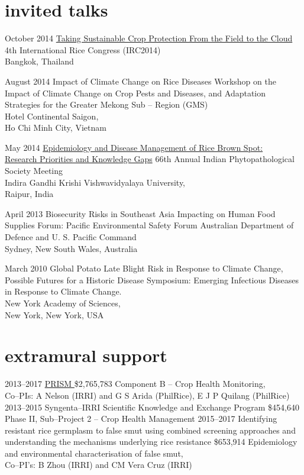 \documentclass[]{friggeri-cv}
\begin{document}
\section*{invited talks}
\begin{entrylist}
 \entry
	{October 2014}
	{\href{http://figshare.com/articles/Taking_Sustainable_Crop_Protection_From_the_Field_to_the_Cloud/1225800}{Taking Sustainable Crop Protection From the Field to the Cloud}}
	{}
	{4th International Rice Congress (IRC2014)\\Bangkok, Thailand}
	{}
	
\entry
 	{August 2014}
	{Impact of Climate Change on Rice Diseases}
	{}
	{Workshop on the Impact of Climate Change on Crop Pests and Diseases, and Adaptation Strategies for the Greater Mekong Sub -- Region (GMS)\\Hotel Continental Saigon,\\Ho Chi Minh City, Vietnam}
	
 \entry
 	{May 2014}
	{\href{http://figshare.com/articles/IPS_2014/1037569}{Epidemiology and Disease Management of Rice Brown Spot:\\Research Priorities and Knowledge Gaps}}
	{}
	{66th Annual Indian Phytopathological Society Meeting\\Indira Gandhi Krishi Vishwavidyalaya University,\\Raipur, India}
	
 \entry
	{April 2013}
	{Biosecurity Risks in Southeast Asia Impacting on Human Food Supplies}
	{}
	{Forum: Pacific Environmental Safety Forum Australian Department of Defence and U. S. Pacific Command\\Sydney, New South Wales, Australia}

 \entry
	 {March 2010} 
	{Global Potato Late Blight Risk in Response to Climate Change, Possible Futures for a Historic Disease}
  	{}
  	{Symposium: Emerging Infectious Diseases in Response to Climate Change.\\New York Academy of Sciences,\\New York, New York, USA}
\end{entrylist}

\section*{extramural support}
  \begin{entrylist}
  \entry
	{2013--2017}
	{\href{http://philippinericeinfo.ph/}{PRISM }}
	{\$2,765,783}
	{Component B -- Crop Health Monitoring,\\Co--PIs: A Nelson (IRRI) and G S Arida (PhilRice), E J P Quilang (PhilRice)}
  \entry
	{2013--2015}
	{Syngenta--IRRI Scientific Knowledge and Exchange Program}
	{\$454,640}
	{Phase II, Sub--Project 2 -- Crop Health Management}
  \entry
    {2015--2017}
    {Identifying resistant rice germplasm to false smut using combined screening approaches and understanding the mechanisms underlying rice resistance}
    {\$653,914}
    {Epidemiology and environmental characterisation of false smut,\\Co--PI's: B Zhou (IRRI) and CM Vera Cruz (IRRI)}
  \end{entrylist}


\end{document}
